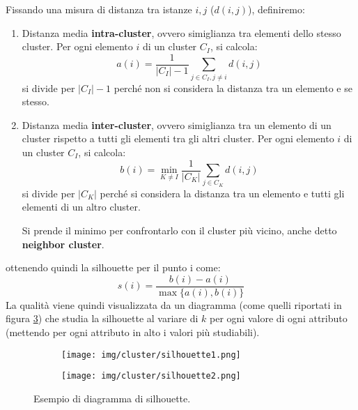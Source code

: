 Fissando una misura di distanza tra istanze $i, j$ ($d(i, j)$), definiremo:
\begin{enumerate}
      \item Distanza media \textbf{intra-cluster}, ovvero simiglianza tra
            elementi dello stesso cluster. Per ogni elemento $i$ di un cluster
            $C_I$, si calcola:
            \begin{equation}
                  a(i) = \frac{1}{|C_I| - 1} \sum_{j \in C_I, j \neq i} d(i, j)
            \end{equation}
            si divide per $|C_I| - 1 $ perché non si considera la distanza tra
            un elemento e se stesso.
      \item Distanza media \textbf{inter-cluster}, ovvero simiglianza tra un
            elemento di un cluster rispetto a tutti gli elementi tra gli altri
            cluster.  Per ogni elemento $i$ di un cluster $C_I$, si calcola:
            \begin{equation}
                  b(i) = \min_{K \neq I} \frac{1}{|C_K|} \sum_{j \in C_K} d(i, j)
            \end{equation}
            si divide per $|C_K|$ perché si considera la distanza tra un elemento
            e tutti gli elementi di un altro cluster.

            Si prende il minimo per confrontarlo con il cluster più vicino, anche
            detto \textbf{neighbor cluster}.
\end{enumerate}
ottenendo quindi la silhouette per il punto i come:
\begin{equation}
      s(i) = \frac{b(i) - a(i)}{\max\{a(i), b(i)\}}
\end{equation}
La qualità viene quindi visualizzata da un diagramma (come quelli riportati in
figura \ref{fig:silhouette}) che studia la silhouette al variare di $k$ per ogni
valore di ogni attributo (mettendo per ogni attributo in alto i valori più
studiabili).
\begin{figure}
      \centering
      \begin{subfigure}[b]{0.6\textwidth}
            \centering
            \texttt{[image: img/cluster/silhouette1.png]}
            \caption{}
            \label{fig:silhouette1}
      \end{subfigure}
      \hfill
      \begin{subfigure}[b]{0.6\textwidth}
            \centering
            \texttt{[image: img/cluster/silhouette2.png]}
            \caption{}
            \label{fig:silhouette2}
      \end{subfigure}
      \caption{Esempio di diagramma di silhouette.}
      \label{fig:silhouette}
\end{figure}
